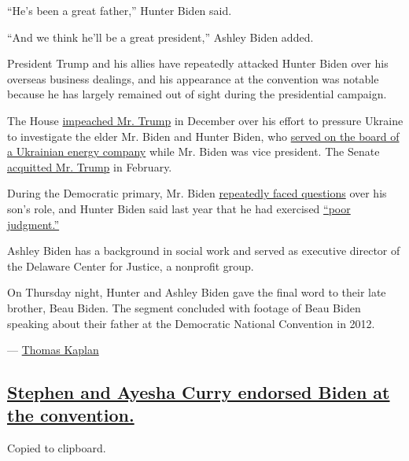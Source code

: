``He's been a great father,'' Hunter Biden said.

``And we think he'll be a great president,'' Ashley Biden added.

President Trump and his allies have repeatedly attacked Hunter Biden
over his overseas business dealings, and his appearance at the
convention was notable because he has largely remained out of sight
during the presidential campaign.

The House
\href{https://www.nytimes3xbfgragh.onion/2019/12/18/us/politics/trump-impeached.html}{impeached
Mr. Trump} in December over his effort to pressure Ukraine to
investigate the elder Mr. Biden and Hunter Biden, who
\href{https://www.nytimes3xbfgragh.onion/2019/05/01/us/politics/biden-son-ukraine.html}{served
on the board of a Ukrainian energy company} while Mr. Biden was vice
president. The Senate
\href{https://www.nytimes3xbfgragh.onion/2020/02/05/us/politics/trump-acquitted-impeachment.html}{acquitted
Mr. Trump} in February.

During the Democratic primary, Mr. Biden
\href{https://www.nytimes3xbfgragh.onion/2020/01/23/us/politics/joe-hunter-biden-ukraine.html}{repeatedly
faced questions} over his son's role, and Hunter Biden said last year
that he had exercised
\href{https://www.nytimes3xbfgragh.onion/2019/10/15/us/politics/hunter-biden-interview.html}{``poor
judgment.''}

Ashley Biden has a background in social work and served as executive
director of the Delaware Center for Justice, a nonprofit group.

On Thursday night, Hunter and Ashley Biden gave the final word to their
late brother, Beau Biden. The segment concluded with footage of Beau
Biden speaking about their father at the Democratic National Convention
in 2012.

--- \href{https://www.nytimes3xbfgragh.onion/by/thomas-kaplan}{Thomas
Kaplan}

\hypertarget{stephen-and-ayesha-curry-endorsed-biden-at-the-convention}{%
\subsection{\texorpdfstring{\protect\hyperlink{stephen-and-ayesha-curry-endorsed-biden-at-the-convention}{Stephen
and Ayesha Curry endorsed Biden at the
convention.}}{Stephen and Ayesha Curry endorsed Biden at the convention.}}\label{stephen-and-ayesha-curry-endorsed-biden-at-the-convention}}

Copied to clipboard.

